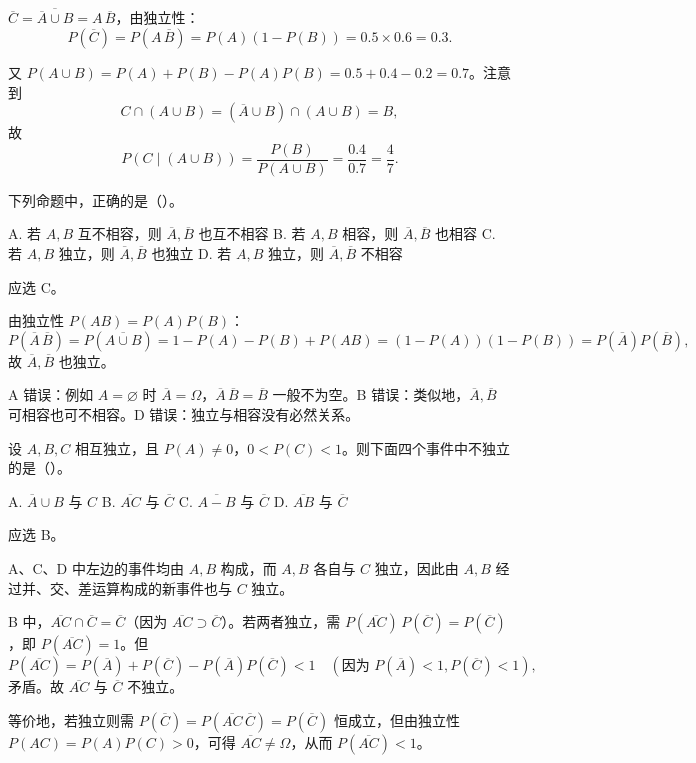 \documentclass[lang=cn,11pt]{elegantbook}
\begin{document}
\begin{solution}
\(\overline{C}=\overline{\overline{A}\cup B}=A\,\overline{B}\)，由独立性：
\[
P(\overline{C}) = P(A\,\overline{B}) = P(A)(1-P(B)) = 0.5\times 0.6 = 0.3.
\]

又 \(P(A\cup B)=P(A)+P(B)-P(A)P(B)=0.5+0.4-0.2=0.7\)。注意到
\[
C\cap(A\cup B) = (\overline{A}\cup B)\cap(A\cup B) = B,
\]
故
\[
P(C\mid(A\cup B)) = \frac{P(B)}{P(A\cup B)} = \frac{0.4}{0.7} = \frac{4}{7}.
\]
\end{solution}

\begin{exercise}\label{exer:1-57}
下列命题中，正确的是（\quad）。\par
A. 若 \(A,B\) 互不相容，则 \(\overline{A},\overline{B}\) 也互不相容\quad
B. 若 \(A,B\) 相容，则 \(\overline{A},\overline{B}\) 也相容\quad
C. 若 \(A,B\) 独立，则 \(\overline{A},\overline{B}\) 也独立\quad
D. 若 \(A,B\) 独立，则 \(\overline{A},\overline{B}\) 不相容
\end{exercise}

\begin{solution}
应选 C。

由独立性 \(P(AB)=P(A)P(B)\)：
\[
P(\overline{A}\,\overline{B}) = P(\overline{A\cup B}) = 1-P(A)-P(B)+P(AB) = (1-P(A))(1-P(B)) = P(\overline{A})P(\overline{B}),
\]
故 \(\overline{A},\overline{B}\) 也独立。

A 错误：例如 \(A=\varnothing\) 时 \(\overline{A}=\Omega\)，\(\overline{A}\,\overline{B}=\overline{B}\) 一般不为空。B 错误：类似地，\(\overline{A},\overline{B}\) 可相容也可不相容。D 错误：独立与相容没有必然关系。
\end{solution}


\begin{exercise}[提高]\label{exer:1-58}
设 \(A,B,C\) 相互独立，且 \(P(A)\neq 0\)，\(0<P(C)<1\)。则下面四个事件中不独立的是（\quad）。\par
A. \(\overline{A}\cup B\) 与 \(C\)\quad
B. \(\overline{AC}\) 与 \(\overline{C}\)\quad
C. \(\overline{A-B}\) 与 \(\overline{C}\)\quad
D. \(\overline{AB}\) 与 \(\overline{C}\)
\end{exercise}

\begin{solution}
应选 B。

A、C、D 中左边的事件均由 \(A,B\) 构成，而 \(A,B\) 各自与 \(C\) 独立，因此由 \(A,B\) 经过并、交、差运算构成的新事件也与 \(C\) 独立。

B 中，\(\overline{AC}\cap\overline{C}=\overline{C}\)（因为 \(\overline{AC}\supset\overline{C}\)）。若两者独立，需 \(P(\overline{AC})\,P(\overline{C})=P(\overline{C})\)，即 \(P(\overline{AC})=1\)。但
\[
P(\overline{AC}) = P(\overline{A})+P(\overline{C})-P(\overline{A})P(\overline{C}) < 1 \quad (\text{因为 }P(\overline{A})<1, P(\overline{C})<1),
\]
矛盾。故 \(\overline{AC}\) 与 \(\overline{C}\) 不独立。

等价地，若独立则需 \(P(\overline{C})=P(\overline{AC}\,\overline{C})=P(\overline{C})\) 恒成立，但由独立性 \(P(AC)=P(A)P(C)>0\)，可得 \(\overline{AC}\neq\Omega\)，从而 \(P(\overline{AC})<1\)。
\end{solution}
\end{document}
